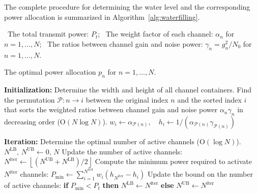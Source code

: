 The complete procedure for determining the water level and the corresponding power allocation is summarized in Algorithm~\ref{alg:waterfilling}.
\begin{algorithm}[!htbp]
\caption{Waterfilling Algorithm for power allocation across Gaussian \ac{SISO} subchannels}
\label{alg:waterfilling}
\begin{algorithmic}[1]
    
    \Require 
    \Statex \hspace{-\algorithmicindent} \textbullet \, The total transmit power: $P_t$;
    \Statex \hspace{-\algorithmicindent} \textbullet \, The weight factor of each channel: $\alpha_n$ for $n = 1, \dots, N$;
    \Statex \hspace{-\algorithmicindent} \textbullet \, The ratios between channel gain and noise power: $\gamma_n = g^2_n / N_0$ for $n = 1, \dots, N$.
    
    \Ensure  The optimal power allocation $p_n$ for $n = 1, \dots, N$.

    \medskip
    \Statex \hspace{-\algorithmicindent}\textbf{Initialization:} Determine the width and height of all channel containers.
    \Statex \hspace{-\algorithmicindent} Find the permutation $\mathcal{P}: n \rightarrow i$ between the original index $n$ and the sorted index $i$ that sorts
    \Statex \hspace{-\algorithmicindent} the weighted ratios between channel gain and noise power $\alpha_n \gamma_n$ in decreasing order ($\mathrm{O}(N\log N)$).
    \State $w_i \leftarrow \alpha_{\mathcal{P}(n)}, \quad h_i \leftarrow 1 / (\alpha_{\mathcal{P}(n)} \gamma_{\mathcal{P}(n)})$
    
    \medskip
    \Statex \hspace{-\algorithmicindent}\textbf{Iteration:} Determine the optimal number of active channels ($\mathrm{O}(\log N)$).
    \State $N^{\mathrm{LB}}, \, N^{\mathrm{UB}} \leftarrow 0, \, N$
        \Statex \hspace{\algorithmicindent/2} Update the number of active channels: 
        \State  $N^{\mathrm{iter}} \leftarrow \left\lfloor (N^{\mathrm{UB}} + N^{\mathrm{LB}}) / 2 \right\rfloor$
        \Statex \hspace{\algorithmicindent/2} Compute the minimum power required to activate $N^{\mathrm{iter}}$ channels:
        \State  $P_{\mathrm{min}} \leftarrow \textstyle\sum_{i=1}^{N^{\mathrm{iter}}} w_i \left( h_{N^{\mathrm{iter}}} - h_i \right)$
        \Statex \hspace{\algorithmicindent/2} Update the bound on the number of active channels:
        \State  \textbf{if} $P_{\mathrm{min}} < P_t$ \textbf{then} $N^{\mathrm{LB}} \leftarrow N^{\mathrm{iter}}$ \textbf{else} $N^{\mathrm{UB}} \leftarrow N^{\mathrm{iter}}$
    \EndWhile
    

\end{algorithmic}
\end{algorithm}
